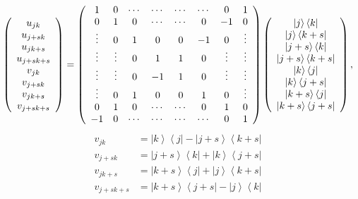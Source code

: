 \documentclass[aps,preprint]{revtex4}%
\begin{document}
\begin{equation}
\left(
\begin{array}
[c]{c}%
u_{jk}\\
u_{j+sk}\\
u_{jk+s}\\
u_{j+sk+s}\\
v_{jk}\\
v_{j+sk}\\
v_{jk+s}\\
v_{j+sk+s}%
\end{array}
\right)  =\left(
\begin{array}
[c]{cccccccc}%
1 & 0 & \cdots & \cdots & \cdots & \cdots & 0 & 1\\
0 & 1 & 0 & \cdots & \cdots & 0 & -1 & 0\\
\vdots & 0 & 1 & 0 & 0 & -1 & 0 & \vdots\\
\vdots & \vdots & 0 & 1 & 1 & 0 & \vdots & \vdots\\
\vdots & \vdots & 0 & -1 & 1 & 0 & \vdots & \vdots\\
\vdots & 0 & 1 & 0 & 0 & 1 & 0 & \vdots\\
0 & 1 & 0 & \cdots & \cdots & 0 & 1 & 0\\
-1 & 0 & \cdots & \cdots & \cdots & \cdots & 0 & 1
\end{array}
\right)  \left(
\begin{array}
[c]{c}%
\left\vert j\right\rangle \left\langle k\right\vert \\
\left\vert j\right\rangle \left\langle k+s\right\vert \\
\left\vert j+s\right\rangle \left\langle k\right\vert \\
\left\vert j+s\right\rangle \left\langle k+s\right\vert \\
\left\vert k\right\rangle \left\langle j\right\vert \\
\left\vert k\right\rangle \left\langle j+s\right\vert \\
\left\vert k+s\right\rangle \left\langle j\right\vert \\
\left\vert k+s\right\rangle \left\langle j+s\right\vert
\end{array}
\right)  ,
\end{equation}%
\begin{align*}
v_{jk}  & =\left\vert k\right\rangle \left\langle j\right\vert -\left\vert
j+s\right\rangle \left\langle k+s\right\vert \\
v_{j+sk}  & =\left\vert j+s\right\rangle \left\langle k\right\vert +\left\vert
k\right\rangle \left\langle j+s\right\vert \\
v_{jk+s}  & =\left\vert k+s\right\rangle \left\langle j\right\vert +\left\vert
j\right\rangle \left\langle k+s\right\vert \\
v_{j+sk+s}  & =\left\vert k+s\right\rangle \left\langle j+s\right\vert
-\left\vert j\right\rangle \left\langle k\right\vert
\end{align*}%
\end{document}
